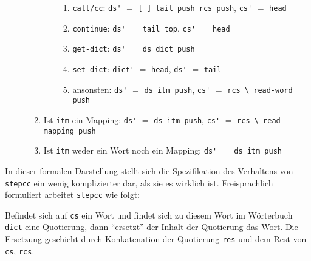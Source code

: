 \begin{description}
\begin{enumerate}
\begin{enumerate}
    \begin{enumerate}
    \item \verb|call/cc|:
       \newline\verb|ds'| $=$ \verb|[ ] tail push rcs push|,    
       \newline\verb|cs'| $=$ \verb|head|
    \item \verb|continue|:
       \newline\verb|ds'| $=$ \verb|tail top|,
       \newline\verb|cs'| $=$ \verb|head|
    \item \verb|get-dict|:
       \newline\verb|ds'| $=$ \verb|ds dict push|
    \item \verb|set-dict|:
       \newline\verb|dict'| $=$ \verb|head|,
       \newline\verb|ds'| $=$ \verb|tail|
    \item ansonsten:
       \newline\verb|ds'| $=$ \verb|ds itm push|,
       \newline\verb|cs'| $=$ \verb|rcs \ read-word push|
    \end{enumerate}
  \end{enumerate}
\item Ist \verb|itm| ein Mapping:
  \newline\verb|ds'| $=$ \verb|ds itm push|,
  \newline\verb|cs'| $=$ \verb|rcs \ read-mapping push|
\item Ist \verb|itm| weder ein Wort noch ein Mapping:
  \newline\verb|ds'| $=$ \verb|ds itm push|
\end{enumerate}
\end{description}

In dieser formalen Darstellung stellt sich die Spezifikation des Verhaltens von \verb|stepcc| ein wenig komplizierter dar, als sie es wirklich ist. Freisprachlich formuliert arbeitet \verb|stepcc| wie folgt:

Befindet sich auf \verb|cs| ein Wort und findet sich zu diesem Wort im Wör\-ter\-buch \verb|dict| eine Quotierung, dann "`ersetzt"' der Inhalt der Quotierung das Wort. Die Ersetzung geschieht durch Konkatenation der Quotierung \verb|res| und dem Rest von \verb|cs|, \verb|rcs|.


